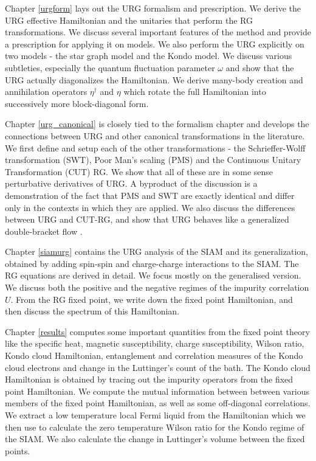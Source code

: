  Chapter \ref{urgform} lays out the URG formalism and prescription. We derive the URG effective Hamiltonian and the unitaries that perform the RG transformations. We discuss several important features of the method and provide a prescription for applying it on models. We also perform the URG explicitly on two models - the star graph model and the Kondo model. We discuss various subtleties, especially the quantum fluctuation parameter \(\omega\) and show that the URG actually diagonalizes the Hamiltonian. We derive many-body creation and annihilation operators \(\eta^\dagger\) and \(\eta\) which rotate the full Hamiltonian into successively more block-diagonal form.

 Chapter \ref{urg_canonical} is closely tied to the formalism chapter and develops the connections between URG and other canonical transformations in the literature. We first define and setup each of the other transformations - the Schrieffer-Wolff transformation (SWT), Poor Man's scaling (PMS) and the Continuous Unitary Transformation (CUT) RG. We show that all of these are in some sense perturbative derivatives of URG. A byproduct of the discussion is a demonstration of the fact that PMS and SWT are exactly identical and differ only in the contexts in which they are applied. We also discuss the differences between URG and CUT-RG, and show that URG behaves like a generalized double-bracket flow \cite{Brockett1991}.

Chapter \ref{siamurg} contains the URG analysis of the SIAM and its generalization, obtained by adding spin-spin and charge-charge interactions to the SIAM. The RG equations are derived in detail. We focus mostly on the generalised version. We discuss both the positive and the negative regimes of the impurity correlation \(U\). From the RG fixed point, we write down the fixed point Hamiltonian, and then discuss the spectrum of this Hamiltonian.

 Chapter \ref{results} computes some important quantities from the fixed point theory like the specific heat, magnetic susceptibility, charge susceptibility, Wilson ratio, Kondo cloud Hamiltonian, entanglement and correlation measures of the Kondo cloud electrons and change in the Luttinger's count of the bath.  The Kondo cloud Hamiltonian is obtained by tracing out the impurity operators from the fixed point Hamiltonian. We compute the mutual information between between various members of the fixed point Hamiltonian, as well as some off-diagonal correlations. We extract a low temperature local Fermi liquid from the Hamiltonian which we then use to calculate the zero temperature Wilson ratio for the Kondo regime of the SIAM. We also calculate the change in Luttinger's volume between the fixed points.
